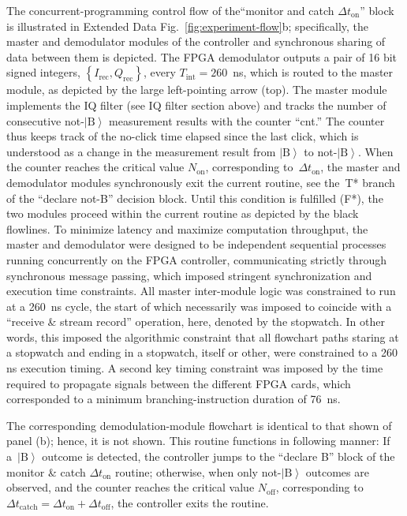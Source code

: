 \documentclass[
	 			preprint,     		superscriptaddress, 																longbibliography,
		amsmath, amssymb,
		aps,  prb,   		floatfix,
		linenumbers     
	]{revtex4-1}
\newcommand{\ket}[1]{\left|#1\right>}
\begin{document}
The concurrent-programming control flow of the``monitor and catch $\Delta t _\mathrm{on}$'' block is illustrated in Extended Data Fig.~\ref{fig:experiment-flow}b; specifically, the master and demodulator modules of the controller and synchronous sharing of data between them is depicted.
The FPGA demodulator outputs a pair of 16 bit signed integers, $\left\{ I_\mathrm{rec}, Q_\mathrm{rec}  \right\}$, every $T_\mathrm{int} = 260$~ns, which is routed to the master module, as depicted by the large left-pointing arrow (top).
The master module implements the IQ filter (see IQ filter section above) and tracks the number of consecutive not-$\ket{\mathrm{B}}$ measurement results with the counter ``cnt.'' The counter thus keeps track of the no-click time elapsed since the last click, which is understood as a change in the measurement result from $\ket{\mathrm{B}}$ to not-$\ket{\mathrm{B}}$.
When the counter reaches the critical value $N_\mathrm{on}$, corresponding to~$\Delta t_\mathrm{on}$, the master and demodulator modules synchronously exit the current routine, see the~T* branch of the ``declare not-B'' decision block.
Until this condition is fulfilled (F*), the two modules proceed within the current routine as depicted by the black flowlines.
To minimize latency and maximize computation throughput, the master and demodulator were designed to be independent sequential processes running concurrently on the FPGA controller,  communicating strictly through synchronous message passing, which imposed stringent synchronization and execution time constraints.
All master inter-module logic was constrained to run at a 260~ns cycle, the start of which necessarily was imposed to coincide with a ``receive \& stream record'' operation, here, denoted by the stopwatch. In other words, this imposed the algorithmic constraint that all flowchart paths staring at a stopwatch and ending in a stopwatch, itself or other, were constrained to a 260\,ns execution timing. A second key timing constraint was imposed by the time required to propagate signals between the different FPGA cards, which corresponded to a minimum branching-instruction duration of 76~ns.

The corresponding demodulation-module flowchart is identical to that shown of panel (b); hence, it is not shown.
This routine functions in following manner:
If a~$\ket{\mathrm{B}}$  outcome is detected, the controller jumps to the ``declare B'' block of the monitor \& catch $\Delta t_\mathrm{on}$ routine;
otherwise, when only not-$\ket{\mathrm{B}}$ outcomes are observed, and the counter reaches the critical value $N_\mathrm{off}$, corresponding to $\Delta t_\mathrm{catch} = \Delta t_\mathrm{on} + \Delta t_\mathrm{off}$, the controller exits the routine.
\end{document}
